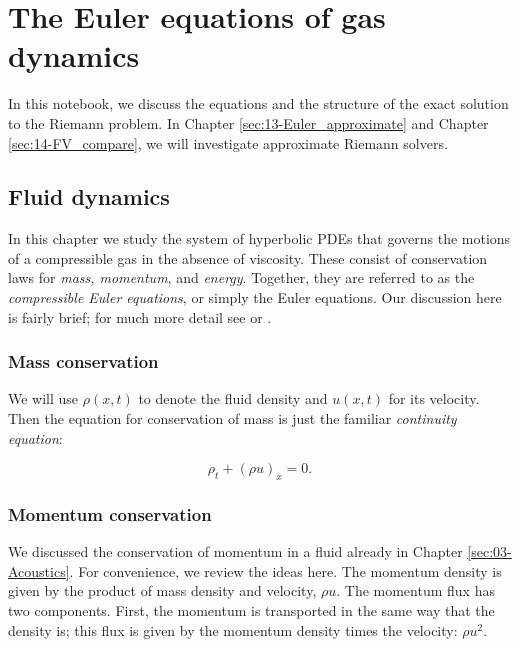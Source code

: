 \documentclass{SIAMbook2016}
\begin{document}
\hypertarget{the-euler-equations-of-gas-dynamics}{%
\chapter{The Euler equations of gas
dynamics}\label{the-euler-equations-of-gas-dynamics}}
\label{sec:09-Euler}
In this notebook, we discuss the equations and the structure of the
exact solution to the Riemann problem. In
Chapter \ref{sec:13-Euler_approximate} and
Chapter \ref{sec:14-FV_compare}, we will investigate approximate Riemann
solvers.

\hypertarget{fluid-dynamics}{%
\section{Fluid dynamics}\label{fluid-dynamics}}

In this chapter we study the system of hyperbolic PDEs that governs the
motions of a compressible gas in the absence of viscosity. These consist
of conservation laws for \emph{mass, momentum}, and \emph{energy}.
Together, they are referred to as the \emph{compressible Euler
equations}, or simply the Euler equations. Our discussion here is fairly
brief; for much more detail see \cite{fvmhp} or \cite{toro2013riemann}.

\hypertarget{mass-conservation}{%
\subsection{Mass conservation}\label{mass-conservation}}

We will use \(\rho(x,t)\) to denote the fluid density and \(u(x,t)\) for
its velocity. Then the equation for conservation of mass is just the
familiar \emph{continuity equation}:

\[\rho_t + (\rho u)_x = 0.\]

\hypertarget{momentum-conservation}{%
\subsection{Momentum conservation}\label{momentum-conservation}}

We discussed the conservation of momentum in a fluid already in
Chapter \ref{sec:03-Acoustics}. For convenience, we review the ideas
here. The momentum density is given by the product of mass density and
velocity, \(\rho u\). The momentum flux has two components. First, the
momentum is transported in the same way that the density is; this flux
is given by the momentum density times the velocity: \(\rho u^2\).
\end{document}
